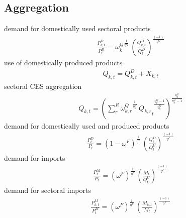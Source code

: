 \subsection{Aggregation}
demand for domestically used sectoral products
\begin{align}
\frac{P^{D}_{k,t}}{P^{D}_{t}}={{\omega^{Q}_{k}}}^{\frac{1}{{{\eta^{Q}}}}}\, \left(\frac{Q^{D}_{k,t}}{{Q^{D}_{t}}}\right)^{\frac{\left(-1\right)}{{{\eta^{Q}}}}} \label{eq:demandsectoraloutput}
\end{align}
use of domestically produced products
\begin{align}
Q_{k,t} = Q^{D}_{k,t} + X_{k,t}
\end{align}
sectoral CES aggregation
\begin{align}
Q_{k,t}=\left(\sum_{r}^{R}{{\omega^{Q}_{k,r}}}^{\frac{1}{{{\eta^{Q}_{k}}}}}\, {{Q_{k,r}}_{t}}^{\frac{{{\eta^{Q}_{k}}}-1}{{{\eta^{Q}_{k}}}}}\right)^{\frac{{{\eta^{Q}_{k}}}}{{{\eta^{Q}_{k}}}-1}}
\end{align}
demand for domestically used and produced products
\begin{align}
\frac{P^{D}_{t}}{P_{t}}={(1 - \omega^{F})}^{\frac{1}{{{\eta^{F}}}}}\, \left(\frac{Q^{D}_{t}}{{Q^{U}_{t}}}\right)^{\frac{\left(-1\right)}{{{\eta^{F}}}}} \label{eq:demanddomesticoutput}
\end{align}
demand for imports
\begin{align}
\frac{P^{M}_{t}}{P_{t}}={(\omega^{F})}^{\frac{1}{{{\eta^{F}}}}}\, \left(\frac{M_{t}}{{Q^{U}_{t}}}\right)^{\frac{\left(-1\right)}{{{\eta^{F}}}}} \label{eq:demandimports}
\end{align}
demand for sectoral imports
\begin{align}
\frac{P^{M}_{k,t}}{P^{M}_{t}}={(\omega^{F})}^{\frac{1}{{{\eta^{F}}}}}\, \left(\frac{M_{k,t}}{{M_{t}}}\right)^{\frac{\left(-1\right)}{{{\eta^{F}}}}} \label{eq:demandsectoralimports}
\end{align}


